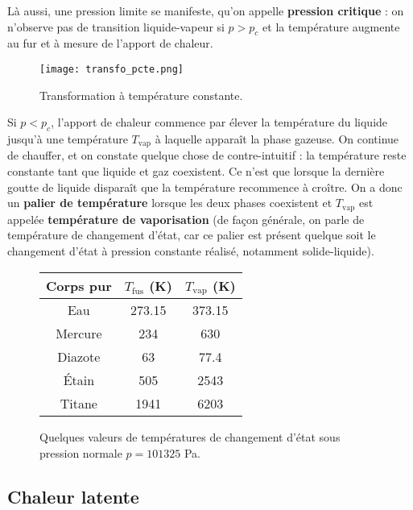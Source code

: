 \documentclass[11pt,a4paper]{report}
\begin{document}
Là aussi, une pression limite se manifeste, qu'on appelle \textbf{pression critique} : on n'observe pas de transition liquide-vapeur si $p > p_c$ et la température augmente au fur et à mesure de l'apport de chaleur.\\

\begin{figure}[h!]
	\begin{center}
		\texttt{[image: transfo\_pcte.png]}
	\end{center}
	\caption{Transformation à température constante.}
\end{figure}

Si $p < p_c$, l'apport de chaleur commence par élever la température du liquide jusqu'à une température $T_\text{vap}$ à laquelle apparaît la phase gazeuse. On continue de chauffer, et on constate quelque chose de contre-intuitif : la température reste constante tant que liquide et gaz coexistent. Ce n'est que lorsque la dernière goutte de liquide disparaît que la température recommence à croître. On a donc un \textbf{palier de température} lorsque les deux phases coexistent et $T_\text{vap}$ est appelée \textbf{température de vaporisation} (de façon générale, on parle de température de changement d'état, car ce palier est présent quelque soit le changement d'état à pression constante réalisé, notamment solide-liquide).\\

\begin{figure}
	\begin{center}
		\begin{tabular}{|c|c|c|}
			\hline
			Corps pur & $T_\text{fus}$ (K) & $T_\text{vap}$ (K) \\
			\hline
			Eau & 273.15 & 373.15\\
			\hline
			Mercure & 234 & 630\\
			\hline
			Diazote & 63 & 77.4\\
			\hline
			Étain & 505 & 2543\\
			\hline
			Titane & 1941 & 6203\\
			\hline
		\end{tabular}
	\end{center}
	\caption{Quelques valeurs de températures de changement d'état sous pression normale 
	$p = 101 325$ Pa.}
\end{figure}

\subsection{Chaleur latente}
\end{document}
